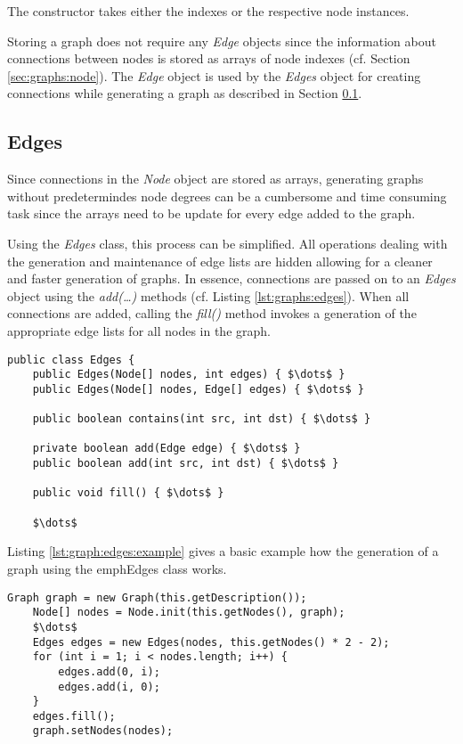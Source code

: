 The constructor takes either the indexes or the respective node instances.

Storing a graph does not require any \emph{Edge} objects since the information about connections between nodes is stored as arrays of node indexes (cf. Section \ref{sec:graphs:node}).
The \emph{Edge} object is used by the \emph{Edges} object for creating connections while generating a graph as described in Section \ref{sec:graphs:edges}.






\subsection{Edges}
\label{sec:graphs:edges}

Since connections in the \emph{Node} object are stored as arrays, generating graphs without predetermindes node degrees can be a cumbersome and time consuming  task since the arrays need to be update for every edge added to the graph.

Using the \emph{Edges} class, this process can be simplified.
All operations dealing with the generation and maintenance of edge lists are hidden allowing for a cleaner and faster generation of graphs.
In essence, connections are passed on to an \emph{Edges} object using the \emph{add(\dots)} methods (cf. Listing \ref{lst:graphs:edges}).
When all connections are added, calling the \emph{fill()} method invokes a generation of the appropriate edge lists for all nodes in the graph.

\begin{lstlisting}[label={lst:graphs:edges}, caption={Constructor and important methods of the \emph{Edges} class}]
public class Edges {
	public Edges(Node[] nodes, int edges) { $\dots$ }
	public Edges(Node[] nodes, Edge[] edges) { $\dots$ }

	public boolean contains(int src, int dst) { $\dots$ }

	private boolean add(Edge edge) { $\dots$ }
	public boolean add(int src, int dst) { $\dots$ }

	public void fill() { $\dots$ }
	
	$\dots$
\end{lstlisting}

Listing \ref{lst:graph:edges:example} gives a basic example how the generation of a graph using the emph{Edges} class works.

\begin{lstlisting}[label={lst:graphs:edges:example}, caption={Example for the usage of the \emph{Edge} object for generating the on and out lists of nodes in a graph}]
	Graph graph = new Graph(this.getDescription());
	Node[] nodes = Node.init(this.getNodes(), graph);
	$\dots$
	Edges edges = new Edges(nodes, this.getNodes() * 2 - 2);
	for (int i = 1; i < nodes.length; i++) {
		edges.add(0, i);
		edges.add(i, 0);
	}
	edges.fill();
	graph.setNodes(nodes);
\end{lstlisting}






